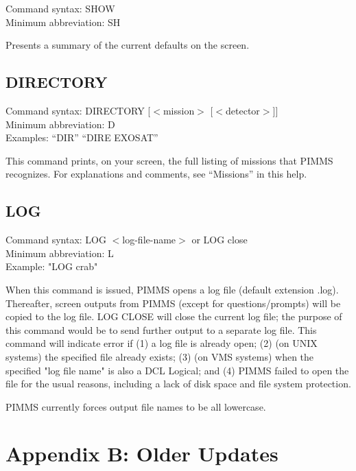 Command syntax: SHOW \\
Minimum abbreviation: SH \\
\vspace{0.5 cm}

Presents a summary of the current defaults on the screen.

\subsection*{DIRECTORY}

Command syntax: DIRECTORY [$<$mission$>$ [$<$detector$>$]] \\
Minimum abbreviation: D \\
Examples: ``DIR'' ``DIRE EXOSAT'' \\
\vspace{0.5 cm}

This command prints, on your screen, the full listing of missions that PIMMS
recognizes.  For explanations and comments, see ``Missions'' in this help.

\subsection*{LOG}

Command syntax: LOG $<$log-file-name$>$ or LOG close \\
Minimum abbreviation: L \\
Example: "LOG crab" \\
\vspace{0.5 cm}

When this command is issued, PIMMS opens a log file (default extension
.log).  Thereafter, screen outputs from PIMMS (except for questions/prompts)
will be copied to the log file.  LOG CLOSE will close the current log file;
the purpose of this command would be to send further output to a separate
log file.  This command will indicate error if (1) a log file is already
open; (2) (on UNIX systems) the specified file already exists; (3) (on
VMS systems) when the specified "log file name" is also a DCL Logical;
and (4) PIMMS failed to open the file for the usual reasons, including
a lack of disk space and file system protection.

PIMMS currently forces output file names to be all lowercase.

\pagebreak

\section*{Appendix B: Older Updates}

